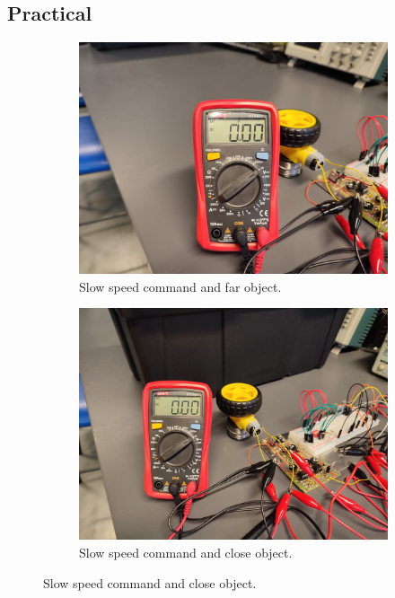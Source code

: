 \subsection{Practical}
\begin{figure}[H]
\centering
\begin{subfigure}[]{0.4\textwidth}
\includegraphics[width=\linewidth]{./Figures/Mtr_Ctrl_Slow_Far.jpeg}
\caption{Slow speed command and far object.}
\label{subfig:mtrctrl_prac_sf}	
\end{subfigure}
\hfill
\begin{subfigure}[]{0.4\textwidth}
\includegraphics[width=\linewidth]{./Figures/Mtr_Ctrl_Slow_Close.jpeg}
\caption{Slow speed command and close object.} 			
\label{subfig:mtrctrl_prac_sc}	

\end{subfigure}
\end{figure}
